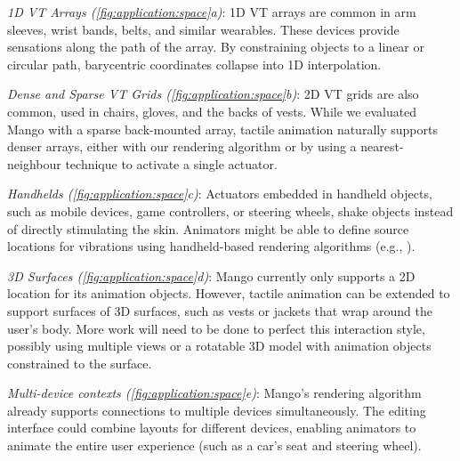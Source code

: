 \emph{1D VT Arrays (\autoref{fig:application:space}a)}:
1D VT arrays are common in arm sleeves, wrist bands, belts, and similar wearables.
These devices provide sensations along the path of the array.
By constraining objects to a linear or circular path, barycentric coordinates collapse into 1D interpolation.

\emph{Dense and Sparse VT Grids  (\autoref{fig:application:space}b)}:
2D VT grids are also common, used in chairs, gloves, and the backs of vests.
While we evaluated Mango with a sparse back-mounted array, tactile animation naturally supports denser arrays, either with our rendering algorithm or by using a nearest-neighbour technique to activate a single actuator.


\emph{Handhelds (\autoref{fig:application:space}c)}:
Actuators embedded in handheld objects, such as mobile devices, game controllers, or steering wheels, shake objects instead of directly stimulating the skin.
Animators might be able to define source locations for vibrations using handheld-based rendering algorithms (e.g., \cite{Seo2013}).


\emph{3D Surfaces  (\autoref{fig:application:space}d)}:
Mango currently only supports a 2D location for its animation objects.
However, tactile animation can be extended to support surfaces of 3D surfaces, such as vests or jackets that wrap around the user's body. 
More work will need to be done to perfect this interaction style, possibly using multiple views or a rotatable 3D model with animation objects constrained to the surface.

\emph{Multi-device contexts  (\autoref{fig:application:space}e)}:
Mango's rendering algorithm already supports connections to multiple devices simultaneously.
The editing interface could combine layouts for different devices, enabling animators to animate the entire user experience (such as a car's seat and steering wheel).

